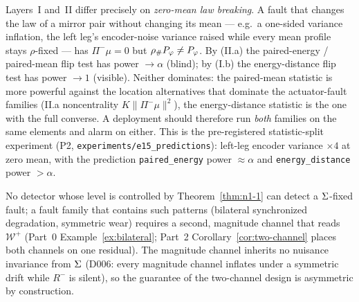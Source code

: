 \begin{remark}
\label{rem:statistic-consistency}
Layers~I and~II differ precisely on \emph{zero-mean law breaking}. A fault
that changes the law of a mirror pair without changing its mean --- e.g.\ a
one-sided variance inflation, the left leg's encoder-noise variance raised
while every mean profile stays $\rho$-fixed --- has $\Pi^-\mu = 0$ but
${\rho}_{\#}P_\varphi \neq P_\varphi$. By (II.a) the paired-energy /
paired-mean flip test has power $\to \alpha$ (blind); by (I.b) the
energy-distance flip test has power $\to 1$ (visible). Neither dominates: the
paired-mean statistic is more powerful against the location alternatives that
dominate the actuator-fault families (II.a noncentrality $K\|\Pi^-\mu\|^2$),
the energy-distance statistic is the one with the full converse. A deployment
should therefore run \emph{both} families on the same elements and alarm on
either. This is the pre-registered statistic-split experiment (P2,
\texttt{experiments/e15\_predictions}): left-leg encoder variance $\times 4$
at zero mean, with the prediction \texttt{paired\_energy} power $\approx
\alpha$ and \texttt{energy\_distance} power $> \alpha$.
\end{remark}

\begin{corollary}
\label{cor:two-channel-necessity}
No detector whose level is controlled by Theorem~\ref{thm:n1-1} can detect a
$\Sigma$-fixed fault; a fault family that contains such patterns
(bilateral synchronized degradation, symmetric wear) requires a second,
magnitude channel that reads $\mathcal{W}^+$ (Part~0 Example~\ref{ex:bilateral};
Part~2 Corollary~\ref{cor:two-channel} places both channels on one
residual). The magnitude channel inherits no nuisance invariance from
$\Sigma$ (D006: every magnitude channel inflates under a symmetric drift
while $R^-$ is silent), so the guarantee of the two-channel design is
asymmetric by construction.
\end{corollary}

